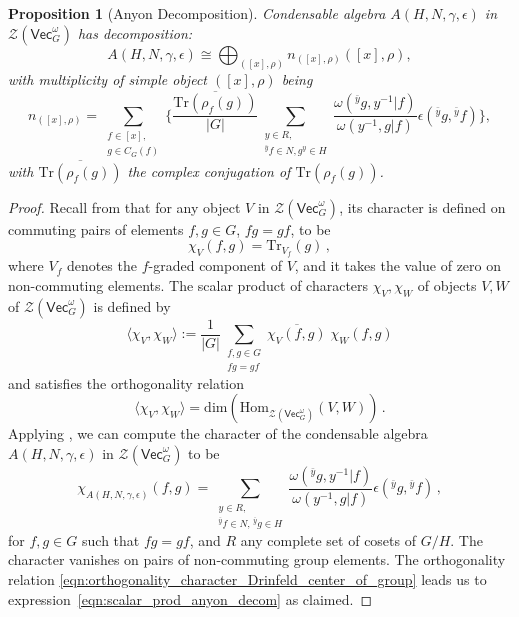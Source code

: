 \documentclass[aps,twocolumn,prx,floatfix,preprintnumbers, nofootinbib,10pt]{revtex4-2}
\numberwithin{equation}{section}
\newtheorem{proposition}[theorem]{Proposition}
\theoremstyle{definition}
\newcommand{\be}{\begin{equation}}
\newcommand{\ee}{\end{equation}}
\newcommand{\lb}{\left(}
\newcommand{\rb}{\right)}
\newcommand{\cZ}{\mathcal{Z}}
\newcommand{\Tr}{\text{Tr}}
\newcommand{\Hom}{\text{Hom}}
\renewcommand{\Vec}{\mathsf{Vec}}
\renewcommand{\dim}{\text{dim}}
\renewcommand{\ol}{\overline}
\renewcommand{\ol}{\overline}
\begin{document}
\begin{proposition}[Anyon Decomposition]
\label{prop:anyon}
    Condensable algebra $A(H, N, \gamma, \epsilon)$ in $\cZ(\Vec_G^\omega)$ has decomposition:
    \be
        A(H,N,\gamma,\epsilon) \cong \bigoplus_{([x],\rho)} n_{([x],\rho)} ([x],\rho),
    \ee
    with multiplicity of simple object $([x], \rho)$ being
    \be
        n_{([x],\rho)} = \!\!\!\!\!\sum_{\substack{f\in [x],\\ g\in C_G(f)}}\!\!\! \biggl\{ \frac{\ol{\Tr(\rho_{f}(g))}}{|G|} \!\!\!\!\!\!\!\!\!\sum_{\substack{y\in R,\\ {}^{\bar{y}}f\in N,g^y\in H}}\!\!\!\!\!\!\frac{\omega({}^{\bar{y}}g,y^{-1}|f)}{\omega(y^{-1},g|f)}\epsilon({}^{\bar{y}}g,{}^{\bar{y}}f)\biggr\},\label{eqn:scalar_prod_anyon_decom}
    \ee
    with $\ol{\Tr(\rho_{f}(g))}$ the complex conjugation of $\Tr(\rho_{f}(g))$.
\end{proposition}

\begin{proof}
    Recall from \cite{davydov2017lagrangian} that for any object $V$ in $\cZ(\Vec_G^\omega)$, its character is defined on commuting pairs of elements $f,g\in G$, $fg=gf$, to be
    \be
        \chi_V(f,g) = \Tr_{V_f}(g)\,,
    \ee
    where $V_f$ denotes the $f$-graded component of $V$, and it takes the value of zero on non-commuting elements.
    The scalar product of characters $\chi_V, \chi_W$ of objects $V,W$ of $\cZ(\Vec_G^{\omega})$ is defined by 
    \be
        \langle \chi_V, \chi_W \rangle := \frac{1}{|G|}\sum_{\substack{f,g\in G\\ fg=gf}} \ol{\chi_V(f, g)}\; \chi_W(f,g)
    \ee
and    satisfies the orthogonality relation 
    \be
    \label{eqn:orthogonality_character_Drinfeld_center_of_group}
        \langle \chi_V, \chi_W\rangle = \dim \lb \Hom_{\cZ(\Vec_G^{\omega})}(V,W) \rb \,.
    \ee
    Applying \cite[Lemma 5.6]{davydov2017lagrangian}, we can compute the character of the condensable algebra $A(H,N,\gamma,\epsilon)$ in $\cZ(\Vec_G^\omega)$ to be 
    \be \label{eqn:character_cond_alg}
    	\chi_{A(H,N,\gamma,\epsilon)}(f,g)=\sum_{\substack{y\in R,\\ {}^{\bar{y}}f\in N,\,{}^{\bar{y}}g\in H}}\frac{\omega({}^{\bar{y}}g,y^{-1}|f)}{\omega(y^{-1},g|f)}\epsilon({}^{\bar{y}}g,{}^{\bar{y}}f)\,,
    \ee
    for $f,g\in G$ such that $fg=gf$, and $R$ any complete set of cosets of $G/H$. The character vanishes on pairs of non-commuting group elements. The orthogonality relation \eqref{eqn:orthogonality_character_Drinfeld_center_of_group} leads us to expression~\eqref{eqn:scalar_prod_anyon_decom} as claimed.
\end{proof}
\end{document}
